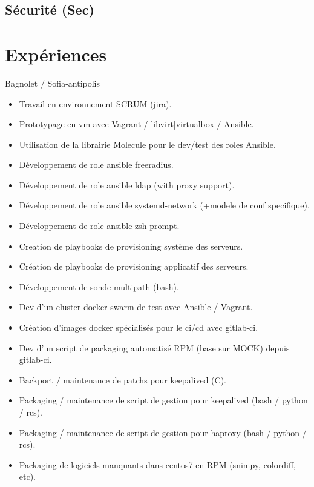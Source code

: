 \documentclass[10pt,a4paper,sans]{moderncv}
\begin{document}
\subsection{Sécurité (Sec)}

\section{Expériences}

{Bagnolet / Sofia-antipolis}{
  \begin{itemize}%
    \item Travail en environnement SCRUM (jira).
    \item Prototypage en vm avec Vagrant / libvirt|virtualbox / Ansible.
    \item Utilisation de la librairie Molecule pour le dev/test des roles Ansible.
    \item Développement de role ansible freeradius.
    \item Développement de role ansible ldap (with proxy support).
    \item Développement de role ansible systemd-network (+modele de conf specifique).
    \item Développement de role ansible zsh-prompt.
    \item Creation de playbooks de provisioning système des serveurs.
    \item Création de playbooks de provisioning applicatif des serveurs.
    \item Développement de sonde multipath (bash).
    \item Dev d'un cluster docker swarm de test avec Ansible / Vagrant.
    \item Création d'images docker spécialisés pour le ci/cd avec gitlab-ci.
    \item Dev d'un script de packaging automatisé RPM (base sur MOCK) depuis gitlab-ci.
    \item Backport / maintenance de patchs pour keepalived (C).
    \item Packaging / maintenance de script de gestion pour keepalived (bash / python / rcs).
    \item Packaging / maintenance de script de gestion pour haproxy (bash / python / rcs).
    \item Packaging de logiciels manquants dans centos7 en RPM (snimpy, colordiff, etc).

\end{itemize}}
\end{document}
